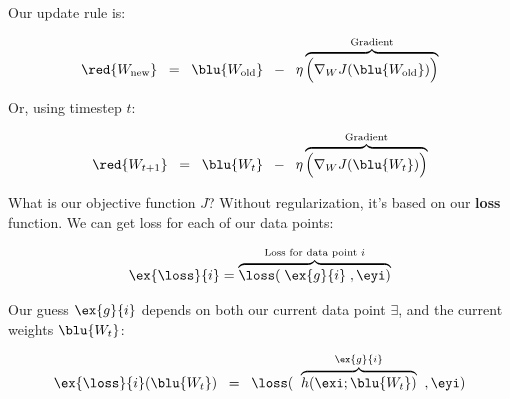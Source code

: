             Our update rule is:
            
            \begin{equation}
                \red{ W_{\text{new}} }
                \;\;=\;\;
                \blu{ W_{\text{old}} }
                \;\;-\;\;
                \eta
                \overbrace{
                    \Big(
                        \nabla_W J ( \blu{ W_{\text{old}} } )
                    \Big)
                }^{\text{Gradient}} 
            \end{equation}
            
            Or, using timestep $t$:
            
            \begin{equation}
                \red{ W_{t+1} } 
                \;\;=\;\;
                \blu{ W_t }
                \;\;-\;\;
                \eta
                \overbrace{
                    \Big(
                        \nabla_W J ( \blu{ W_t } )
                    \Big)
                }^{\text{Gradient}}
            \end{equation}
            
            What is our objective function $J$? Without regularization, it's based on our \textbf{loss} function. We can get loss for each of our data points:
            
            \begin{equation}
                \ex{\loss}{i}
                =
                \overbrace{
                    \loss(
                    \; \ex{g}{i} \;
                    ,\eyi
                    )
                }^{\text{Loss for data point $i$}}
            \end{equation}
            
            Our guess $\ex{g}{i}$ depends on both our current data point $\exi$, and the current weights $\blu{ W_t }$:
            
            \begin{equation}
                \ex{\loss}{i}(\blu{ W_t })
                \;\;=\;\;
                \loss(
                \;\;
                \overbrace{
                     h(\exi;\blu{ W_t }) 
                }^{\ex{g}{i}}
                \;\;
                ,\eyi
                )
            \end{equation}
    
        \phantom{}
    
